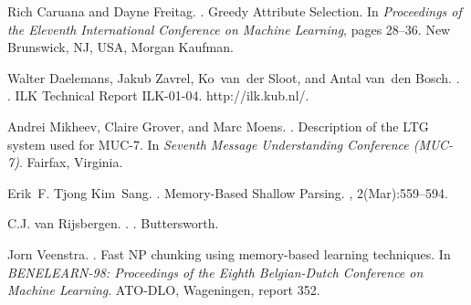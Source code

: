 \documentclass[10pt]{article}
\begin{document}
%
%

\begin{thebibliography}{}

Rich Caruana and Dayne Freitag.
.
\newblock Greedy Attribute Selection.
\newblock In {\em Proceedings of the Eleventh International Conference on
  Machine Learning}, pages 28--36. New Brunswick, NJ, USA, Morgan Kaufman.

Walter Daelemans, Jakub Zavrel, Ko~van~der Sloot, and Antal van~den Bosch.
.
.
\newblock ILK Technical Report ILK-01-04.
\newblock http://ilk.kub.nl/.

Andrei Mikheev, Claire Grover, and Marc Moens.
.
\newblock Description of the LTG system used for MUC-7.
\newblock In {\em Seventh Message Understanding Conference (MUC-7)}. Fairfax,
  Virginia.

Erik~F. Tjong Kim~Sang.
.
\newblock Memory-Based Shallow Parsing.
, 2(Mar):559--594.

C.J. van Rijsbergen.
.
.
\newblock Buttersworth.

Jorn Veenstra.
.
\newblock Fast NP chunking using memory-based learning techniques.
\newblock In {\em BENELEARN-98: Proceedings of the Eighth Belgian-Dutch
  Conference on Machine Learning}. ATO-DLO, Wageningen, report 352.

\end{thebibliography}
\end{document}
